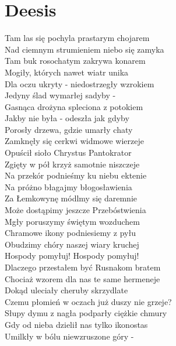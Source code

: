 \section{Deesis}
\begin{minipage}[t]{\dimexpr.4\textwidth-.4\columnsep}
    \footnotesize{
    Tam las się pochyla prastarym chojarem\\
    Nad ciemnym strumieniem niebo się zamyka\\
    Tam buk rosochatym zakrywa konarem\\
    Mogiły, których nawet wiatr unika\\
    \hfill\break
    Dla oczu ukryty - niedostrzegły wzrokiem\\
    Jedyny ślad wymarłej sadyby -\\
    Gasnąca drożyna spleciona z potokiem\\
    Jakby nie była - odeszła jak gdyby\\
    \hfill\break
    Porosły drzewa, gdzie umarły chaty\\
    Zamknęły się cerkwi widmowe wierzeje\\
    Opuścił sioło Chrystus Pantokrator\\
    Zgięty w pół krzyż samotnie niszczeje\\
    \hfill\break
    \vin Na przekór podnieśmy ku niebu ektenie\\
    \vin Na próżno błagajmy błogosławienia\\
    \vin Za Łemkowynę módlmy się daremnie\\
    \vin Może dostąpimy jeszcze Przebóstwienia\\
    \hfill\break
    \vin Mgły poruszymy świętym wozduchem\\
    \vin Chramowe ikony podniesiemy z pyłu\\
    \vin Obudzimy chóry naszej wiary kruchej\\
    \vin Hospody pomyłuj! Hospody pomyłuj!\\
    \hfill\break
    Dlaczego przestałem być Rusnakom bratem\\
    Chociaż wzorem dla nas te same hermeneje\\
    Dokąd uleciały cheruby skrzydlate\\
    Czemu płomień w oczach już duszy nie grzeje?\\
    \hfill\break
    Słupy dymu z nagła podparły ciężkie chmury\\
    Gdy od nieba dzielił nas tylko ikonostas\\
    Umilkły w bólu niewzruszone góry -\\
}
\end{minipage}
